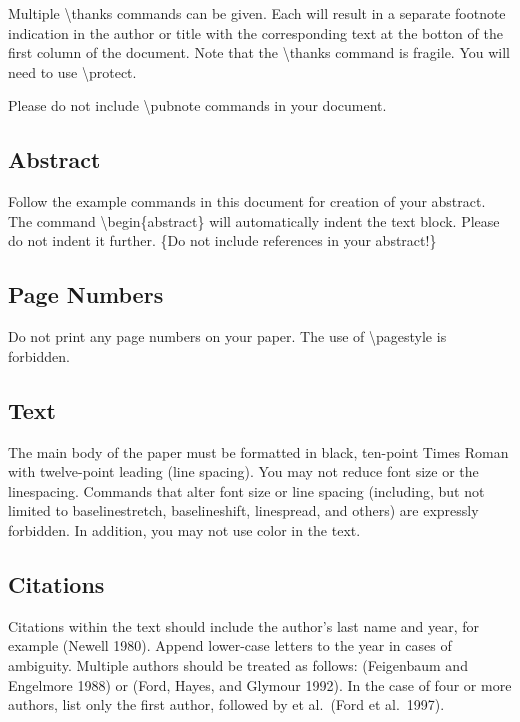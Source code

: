 Multiple \textbackslash thanks commands can be given. Each will result
in a separate footnote indication in the author or title with the
corresponding text at the botton of the first column of the document.
Note that the \textbackslash thanks command is fragile. You will need to
use \textbackslash protect.

Please do not include \textbackslash pubnote commands in your document.

\subsection{Abstract}

Follow the example commands in this document for creation of your
abstract. The command \textbackslash begin\{abstract\} will
automatically indent the text block. Please do not indent it further.
\{Do not include references in your abstract!\}

\subsection{Page Numbers}

Do not print any page numbers on your paper. The use of
\textbackslash pagestyle is forbidden.

\subsection{Text}

The main body of the paper must be formatted in black, ten-point Times
Roman with twelve-point leading (line spacing). You may not reduce font
size or the linespacing. Commands that alter font size or line spacing
(including, but not limited to baselinestretch, baselineshift,
linespread, and others) are expressly forbidden. In addition, you may
not use color in the text.

\subsection{Citations}

Citations within the text should include the author's last name and
year, for example (Newell 1980). Append lower-case letters to the year
in cases of ambiguity. Multiple authors should be treated as follows:
(Feigenbaum and Engelmore 1988) or (Ford, Hayes, and Glymour 1992). In
the case of four or more authors, list only the first author, followed
by et al.~(Ford et al.~1997).

